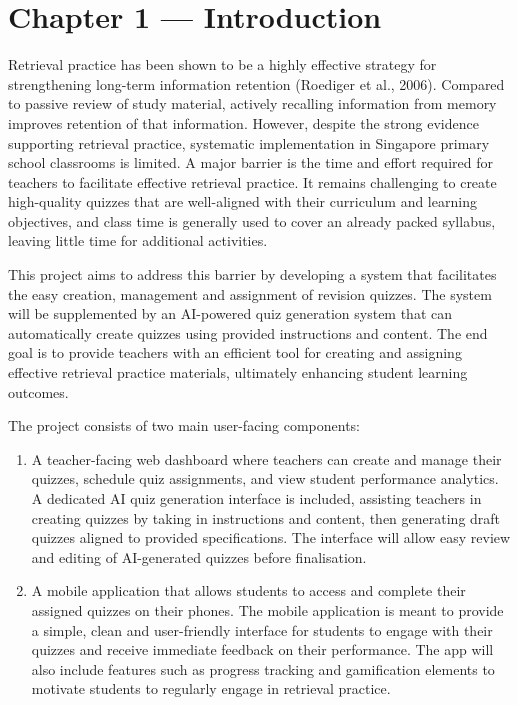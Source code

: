 \documentclass[
  12pt,
  a4paper,
]{report}
\begin{document}
\clearpage
\setcounter{tocdepth}{1}
\tableofcontents
\clearpage
\setcounter{frontmatterlastromanpage}{\value{page}}
\setcounter{page}{1}

\hypertarget{chapter-1-introduction}{%
\chapter{Chapter 1 --- Introduction}\label{chapter-1-introduction}}

Retrieval practice has been shown to be a highly effective strategy for
strengthening long-term information retention (Roediger et al., 2006). Compared to passive
review of study material, actively recalling information from memory
improves retention of that information. However, despite the strong
evidence supporting retrieval practice, systematic implementation in Singapore
primary school classrooms is limited. A major barrier is the time and effort
required for teachers to facilitate
effective retrieval practice. It remains challenging to create
high-quality quizzes that are well-aligned with their curriculum and
learning objectives, and class time is generally used to cover an
already packed syllabus, leaving little time for additional activities.

This project aims to address this barrier by developing a system that
facilitates the easy creation, management and assignment of revision
quizzes. The system will be supplemented by an AI-powered quiz
generation system that can automatically create quizzes using
provided instructions and content. The end goal is to provide
teachers with an efficient tool for creating and assigning effective
retrieval practice materials, ultimately enhancing student learning
outcomes.

The project consists of two main user-facing components:

\begin{enumerate}
\def\labelenumi{\arabic{enumi}.}
\item
  A teacher-facing web dashboard where teachers can create and manage
  their quizzes, schedule quiz assignments, and view student performance
  analytics. A dedicated AI quiz generation interface is included,
  assisting teachers in creating quizzes by taking in instructions and
  content, then generating draft quizzes aligned to provided
  specifications. The interface will allow easy review and editing of
  AI-generated quizzes before finalisation.
\item
  A mobile application that allows students to access and complete their
  assigned quizzes on their phones. The mobile application is meant to
  provide a simple, clean and user-friendly interface for students to
  engage with their quizzes and receive immediate feedback on their
  performance. The app will also include features such as progress
  tracking and gamification elements to motivate students to regularly
  engage in retrieval practice.
\end{enumerate}
\end{document}
